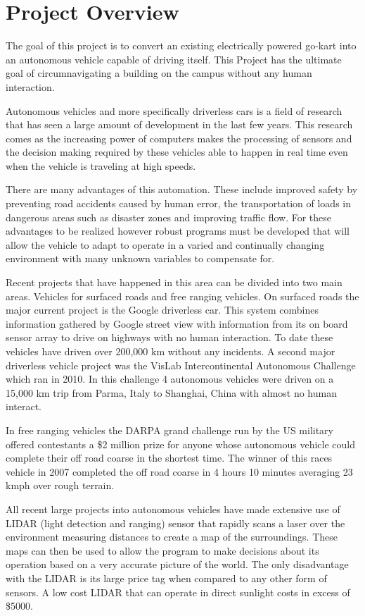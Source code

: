 \chapter{Project Overview}

The goal of this project is to convert an existing electrically powered go-kart into an autonomous vehicle capable of driving itself. This Project has the ultimate goal of circumnavigating a building on the campus without any human interaction.

Autonomous vehicles and more specifically driverless cars is a field of research that has seen a large amount of development in the last few years. This research comes as the increasing power of computers makes the processing of sensors and the decision making required by these vehicles able to happen in real time even when the vehicle is traveling at high speeds.

There are many advantages of this automation. These include improved safety by preventing road accidents caused by human error, the transportation of loads in dangerous areas such as disaster zones and improving traffic flow. For these advantages to be realized however robust programs must be developed that will allow the vehicle to adapt to operate in a varied and continually changing environment with many unknown variables to compensate for.

Recent projects that have happened in this area can be divided into two main areas. Vehicles for surfaced roads and free ranging vehicles. On surfaced roads the major current project is the Google driverless car. This system combines information gathered by Google street view with information from its on board sensor array to drive on highways with no human interaction. To date these vehicles have driven over 200,000 km without any incidents. A second major driverless vehicle project was the VisLab Intercontinental Autonomous Challenge which ran in 2010. In this challenge 4 autonomous vehicles were driven on a 15,000 km trip from Parma, Italy to Shanghai, China with almost no human interact.

 In free ranging vehicles the DARPA grand challenge run by the US military offered contestants a \$2 million prize for anyone whose autonomous vehicle could complete their off road coarse in the shortest time. The winner of this races vehicle in 2007 completed the off road coarse in 4 hours 10 minutes averaging 23 kmph over rough terrain.

All recent large projects into autonomous vehicles have made extensive use of LIDAR (light detection and ranging) sensor that rapidly scans a laser over the environment measuring distances to create a map of the surroundings. These maps can then be used to allow the program to make decisions about its operation based on a very accurate picture of the world. The only disadvantage with the LIDAR is its large price tag when compared to any other form of sensors. A low cost LIDAR that can operate in direct sunlight costs in excess of \$5000. 


